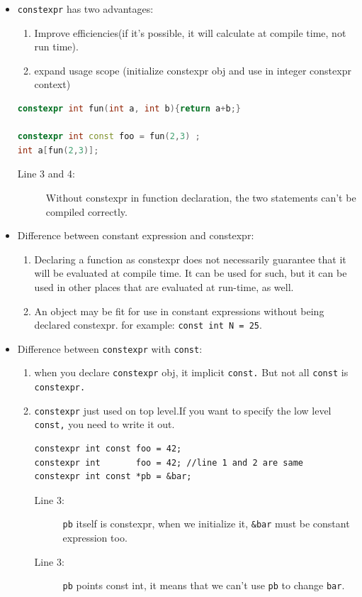 \documentclass[a4paper,11pt,twoside]{book}
\begin{document}
\begin{itemize}
	\item \texttt{constexpr} has two advantages:
	\begin{enumerate}
		\item Improve efficiencies(if it's possible, it will calculate at compile time, not run time). 
		
		\item expand usage scope (initialize constexpr obj and use in integer constexpr context)
	\end{enumerate}
\begin{lstlisting}[frame=single, language=c++]
constexpr int fun(int a, int b){return a+b;}

constexpr int const foo = fun(2,3) ; 
int a[fun(2,3)];
\end{lstlisting}
	\begin{description}
		\item[Line 3 and 4:] Without constexpr in function declaration, the two statements can't be compiled correctly.
	\end{description}
	
	\item Difference between constant expression and constexpr:
	\begin{enumerate}
		\item Declaring a function as constexpr does not necessarily guarantee that it will be evaluated at compile time. It can be used for such, but it can be used in other places that are evaluated at run-time, as well.
		
		\item An object may be fit for use in constant expressions without being declared constexpr. for example: \texttt{const int N = 25}.
	\end{enumerate}
	
	\item Difference between \texttt{constexpr} with \texttt{const}:
	\begin{enumerate}
		\item when you declare \texttt{constexpr} obj, it implicit \texttt{const.} But not all \texttt{const} is \texttt{constexpr.}
		
		\item \texttt{constexpr} just used on top level.If you want to specify the low level \texttt{const,} you need to write it out.
\begin{lstlisting}
constexpr int const foo = 42;
constexpr int       foo = 42; //line 1 and 2 are same 
constexpr int const *pb = &bar; 
\end{lstlisting}
		\begin{description}
			\item[Line 3:] \texttt{pb} itself is constexpr, when we initialize it, \texttt{\&bar} must be constant expression too.
			\item[Line 3:] \texttt{pb} points const int, it means that we can't use \texttt{pb} to change \texttt{bar}.
		\end{description}
	\end{enumerate}
	
\end{itemize}
\end{document}
